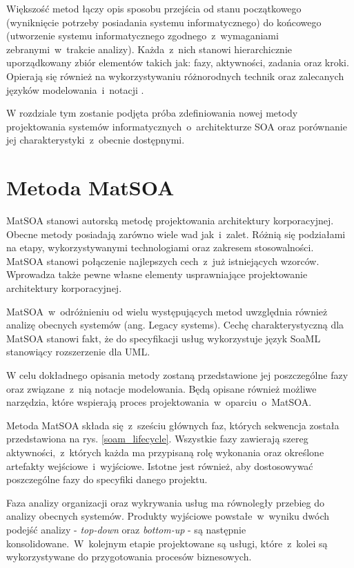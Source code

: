 Większość metod łączy opis sposobu przejścia od stanu początkowego (wyniknięcie potrzeby posiadania systemu informatycznego) do końcowego (utworzenie systemu informatycznego zgodnego~z~wymaganiami zebranymi~w~trakcie analizy). Każda~z~nich stanowi hierarchicznie uporządkowany zbiór elementów takich jak: fazy, aktywności, zadania oraz kroki. Opierają się również na wykorzystywaniu różnorodnych technik oraz zalecanych języków modelowania~i~notacji \cite{OffCompSOAM}.

W rozdziale tym zostanie podjęta próba zdefiniowania nowej metody projektowania systemów informatycznych~o~architekturze SOA oraz porównanie jej charakterystyki~z~obecnie dostępnymi.


\section{Metoda MatSOA}
MatSOA stanowi autorską metodę projektowania architektury korporacyjnej. Obecne metody posiadają zarówno wiele wad jak~i~zalet. Różnią się podziałami na etapy, wykorzystywanymi technologiami oraz zakresem stosowalności. MatSOA stanowi połączenie najlepszych cech~z~już istniejących wzorców. Wprowadza także pewne własne elementy usprawniające projektowanie architektury korporacyjnej. 

MatSOA~w~odróżnieniu od wielu występujących metod uwzględnia również analizę obecnych systemów (ang. Legacy systems). Cechę charakterystyczną dla MatSOA stanowi fakt, że do specyfikacji usług wykorzystuje język SoaML stanowiący rozszerzenie dla UML. 

W celu dokładnego opisania metody zostaną przedstawione jej poszczególne fazy oraz związane~z~nią notacje modelowania. Będą opisane również możliwe narzędzia, które wspierają proces projektowania~w~oparciu~o~MatSOA.

Metoda MatSOA składa się~z~sześciu głównych faz, których sekwencja została przedstawiona na rys. \ref{soam_lifecycle}. Wszystkie fazy zawierają szereg aktywności,~z~których każda ma przypisaną rolę wykonania oraz określone artefakty wejściowe~i~wyjściowe. Istotne jest również, aby dostosowywać poszczególne fazy do specyfiki danego projektu. 

Faza analizy organizacji oraz wykrywania usług ma równoległy przebieg do analizy obecnych systemów. Produkty wyjściowe powstałe~w~wyniku dwóch podejść analizy - \emph{top-down} oraz \emph{bottom-up} - są następnie konsolidowane.~W~kolejnym etapie projektowane są usługi, które~z~kolei są wykorzystywane do przygotowania procesów biznesowych.

